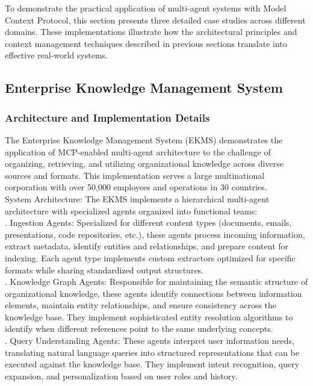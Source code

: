 To demonstrate the practical application of multi-agent systems with Model Context Protocol, this section presents three detailed case studies across different domains. These implementations illustrate how the architectural principles and context management techniques described in previous sections translate into effective real-world systems.\\
\subsection{Enterprise Knowledge Management System}
\subsubsection{Architecture and Implementation Details}
The Enterprise Knowledge Management System (EKMS) demonstrates the application of MCP-enabled multi-agent architecture to the challenge of organizing, retrieving, and utilizing organizational knowledge across diverse sources and formats. This implementation serves a large multinational corporation with over 50,000 employees and operations in 30 countries.\\ \newline
System Architecture: The EKMS implements a hierarchical multi-agent architecture with specialized agents organized into functional teams:\\ . Ingestion Agents: Specialized for different content types (documents, emails, presentations, code repositories, etc.), these agents process incoming information, extract metadata, identify entities and relationships, and prepare content for indexing. Each agent type implements custom extractors optimized for specific formats while sharing standardized output structures.\\ . Knowledge Graph Agents: Responsible for maintaining the semantic structure of organizational knowledge, these agents identify connections between information elements, maintain entity relationships, and ensure consistency across the knowledge base. They implement sophisticated entity resolution algorithms to identify when different references point to the same underlying concepts.\\ . Query Understanding Agents: These agents interpret user information needs, translating natural language queries into structured representations that can be executed against the knowledge base. They implement intent recognition, query expansion, and personalization based on user roles and history.\\ \newline
